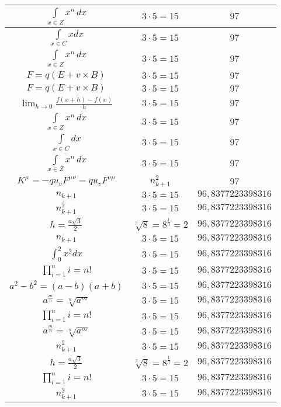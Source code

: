 \documentclass{article}
\begin{document}
\begin{flushleft}
\begin{longtable}{|c|c|c|}
$\int \limits_{x\in Z}\!x^{n}\,dx$ & $3\cdot 5=15$ & $97$ \\ \hline 
$\int \limits_{x\in C}xdx$ & $3\cdot 5=15$ & $97$ \\ \hline 
$\int \limits_{x\in Z}\!x^{n}\,dx$ & $3\cdot 5=15$ & $97$ \\ \hline 
$F=q\left(E+v\times B\right)$ & $3\cdot 5=15$ & $97$ \\ \hline 
$F=q\left(E+v\times B\right)$ & $3\cdot 5=15$ & $97$ \\ \hline 
$\lim_{h\to0}\frac{f(x+h)-f(x)}{h}$ & $3\cdot 5=15$ & $97$ \\ \hline 
$\int \limits_{x\in Z}\!x^{n}\,dx$ & $3\cdot 5=15$ & $97$ \\ \hline 
$\int \limits_{x\in C}dx$ & $3\cdot 5=15$ & $97$ \\ \hline 
$\int \limits_{x\in Z}\!x^{n}\,dx$ & $3\cdot 5=15$ & $97$ \\ \hline 
$K^\mu=-qu_vF^{\mu\nu}=qu_vF^{\nu\mu}$ & $n_{k+1}^2$ & $97$ \\ \hline 
$n_{k+1}$ & $3\cdot 5=15$ & $96,8377223398316$ \\ \hline 
$n_{k+1}^2$ & $3\cdot 5=15$ & $96,8377223398316$ \\ \hline 
$h=\frac{a\sqrt{3}}{2}$ & $\sqrt[3]{8}=8^{\frac{1}{3}}=2$ & $96,8377223398316$ \\ \hline 
$n_{k+1}$ & $3\cdot 5=15$ & $96,8377223398316$ \\ \hline 
$\int _0^2x^2dx$ & $3\cdot 5=15$ & $96,8377223398316$ \\ \hline 
$\prod_{i=1}^ni=n!$ & $3\cdot 5=15$ & $96,8377223398316$ \\ \hline 
$a^2-b^2=(a-b)(a+b)$ & $3\cdot 5=15$ & $96,8377223398316$ \\ \hline 
$a^{\frac{m}{n}}=\sqrt[n]{a^{m}}$ & $3\cdot 5=15$ & $96,8377223398316$ \\ \hline 
$\prod_{i=1}^ni=n!$ & $3\cdot 5=15$ & $96,8377223398316$ \\ \hline 
$a^{\frac{m}{n}}=\sqrt[n]{a^{m}}$ & $3\cdot 5=15$ & $96,8377223398316$ \\ \hline 
$n_{k+1}^2$ & $3\cdot 5=15$ & $96,8377223398316$ \\ \hline 
$h=\frac{a\sqrt{3}}{2}$ & $\sqrt[3]{8}=8^{\frac{1}{3}}=2$ & $96,8377223398316$ \\ \hline 
$\prod_{i=1}^ni=n!$ & $3\cdot 5=15$ & $96,8377223398316$ \\ \hline 
$n_{k+1}^2$ & $3\cdot 5=15$ & $96,8377223398316$ \\ \hline 

\end{longtable}
\end{flushleft}
\end{document}
